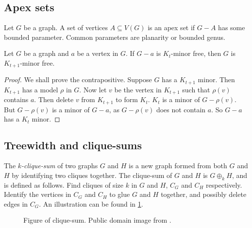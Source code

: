 \subsection{Apex sets}\label{sssec:Apex_Vertices}
Let $G$ be a graph. A set of vertices $A \subseteq V(G)$ is an apex set if $G - A$ has some bounded parameter. Common parameters are planarity or bounded genus. 
\begin{proposition}
	Let $G$ be a graph and $a$ be a vertex in $G$. If \(G-a\) is \(K_{t}\)-minor free, then $G$ is $K_{t+1}$-minor free. 
\end{proposition}
\begin{proof}
	We shall prove the contrapositive. Suppose \(G\) has a \(K_{t + 1}\) minor. Then \(K_{t + 1}\) has a model $\rho$ in \(G\). Now let \(v\) be the vertex in \(K_{t + 1}\) such that \(\rho(v)\) contains \(a\). Then delete \(v\) from \(K_{t + 1}\) to form $K_t$. \(K_t\) is a minor of \(G - \rho(v)\). But \(G - \rho(v)\) is a minor of \(G - a\), as \(G - \rho(v)\) does not contain \(a\). So \(G - a\) has a \(K_t\) minor. 
\end{proof}
\subsection{Treewidth and clique-sums}\label{sssec:Clique_Sums}
The \textit{\(k\)-clique-sum} of two graphs \(G\) and \(H\) is a new graph formed from both $G$ and $H$ by identifying two cliques together. The clique-sum of $G$ and $H$ is \(G \oplus_k H\), and is defined as follows. Find cliques of size $k$ in \(G\) and \(H\), \(C_G\) and \(C_H\) respectively. Identify the vertices in \(C_G\) and \(C_H\) to glue \(G\) and \(H\) together, and possibly delete edges in $C_G$. An illustration can be found in \cref{fig:clique-sum}. 

\begin{figure}[h]
	\centering
	
	\caption[Clique-sum]{Figure of clique-sum. Public domain image from \textcite{eppsteinCliquesum2023}.}\label{fig:clique-sum}
\end{figure}


